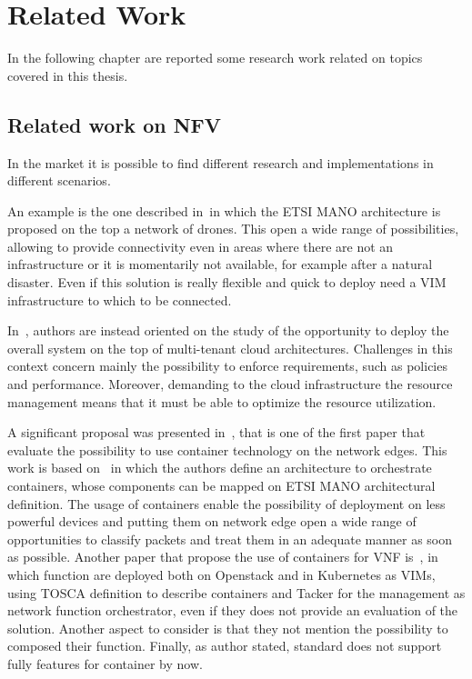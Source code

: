 \chapter{Related Work}
\label{chap:rel_wk}

In the following chapter are reported some research work related on topics
covered in this thesis. 

\section{Related work on NFV}
In the market it is possible to find different research and implementations in
different scenarios.

An example is the one described in~\cite{nogales2018nfv}in
which the ETSI MANO architecture is proposed on the top a network of drones.
This open a wide range of possibilities, allowing to provide connectivity even
in areas where there are not an infrastructure or it is momentarily not
available, for example after a natural disaster. Even if this solution is really
flexible and quick to deploy need a VIM infrastructure to which to be connected.

In~\cite{yu2015network}, authors are instead oriented on the study of the
opportunity to deploy the overall system on the top of multi-tenant cloud
architectures. Challenges in this context concern mainly the possibility to
enforce requirements, such as policies and performance. Moreover, demanding to
the cloud infrastructure the resource management means that it must be able to
optimize the resource utilization.

A significant proposal was presented in~\cite{cziva2017container}, that is one
of the first paper that evaluate the possibility to use container technology on
the network edges. This work is based on~\cite{cziva2015container} in which the
authors define an architecture to orchestrate containers, whose components can
be mapped on ETSI MANO architectural definition. The usage of containers enable
the possibility of deployment on less powerful devices and putting them on
network edge open a wide range of opportunities to classify packets and treat
them in an adequate manner as soon as possible. Another paper that propose the
use of containers for VNF is~\cite{hoang2018extended}, in which function are
deployed both on Openstack and in Kubernetes as VIMs, using TOSCA definition to
describe containers and Tacker for the management as network function
orchestrator, even if they does not provide an evaluation of the solution.
Another aspect to consider is that they not mention the possibility to composed
their function. Finally, as author stated, standard does not support fully
features for container by now.


